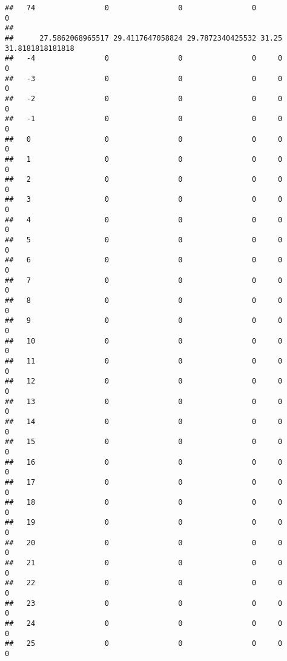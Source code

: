 \documentclass[]{article}
\begin{document}
\begin{verbatim}
##   74                0                0                0                0
##     
##      27.5862068965517 29.4117647058824 29.7872340425532 31.25 31.8181818181818
##   -4                0                0                0     0                0
##   -3                0                0                0     0                0
##   -2                0                0                0     0                0
##   -1                0                0                0     0                0
##   0                 0                0                0     0                0
##   1                 0                0                0     0                0
##   2                 0                0                0     0                0
##   3                 0                0                0     0                0
##   4                 0                0                0     0                0
##   5                 0                0                0     0                0
##   6                 0                0                0     0                0
##   7                 0                0                0     0                0
##   8                 0                0                0     0                0
##   9                 0                0                0     0                0
##   10                0                0                0     0                0
##   11                0                0                0     0                0
##   12                0                0                0     0                0
##   13                0                0                0     0                0
##   14                0                0                0     0                0
##   15                0                0                0     0                0
##   16                0                0                0     0                0
##   17                0                0                0     0                0
##   18                0                0                0     0                0
##   19                0                0                0     0                0
##   20                0                0                0     0                0
##   21                0                0                0     0                0
##   22                0                0                0     0                0
##   23                0                0                0     0                0
##   24                0                0                0     0                0
##   25                0                0                0     0                0

\end{verbatim}
\end{document}
